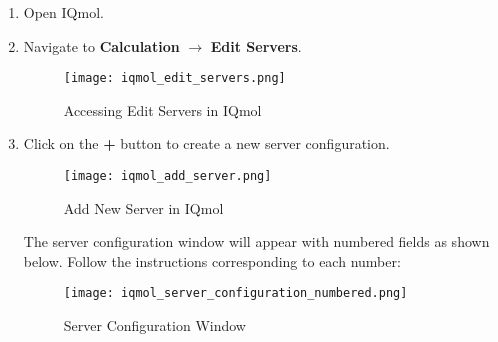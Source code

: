 \documentclass[12pt,letterpaper]{article}
\begin{document}
\begin{enumerate}
    \item Open IQmol.
    \item Navigate to \textbf{Calculation} $\rightarrow$ \textbf{Edit Servers}.

    \begin{figure}[H]
        \centering
        \texttt{[image: iqmol\_edit\_servers.png]}
        \caption{Accessing Edit Servers in IQmol}
        \label{fig:iqmol_edit_servers}
    \end{figure}

    \item Click on the \textbf{+} button to create a new server configuration.

    \begin{figure}[H]
        \centering
        \texttt{[image: iqmol\_add\_server.png]}
        \caption{Add New Server in IQmol}
        \label{fig:iqmol_add_server}
    \end{figure}

    The server configuration window will appear with numbered fields as shown below. Follow the instructions corresponding to each number:

    \begin{figure}[H]
        \centering
        \texttt{[image: iqmol\_server\_configuration\_numbered.png]}
        \caption{Server Configuration Window}
        \label{fig:iqmol_server_configuration}
    \end{figure}


\end{enumerate}
\end{document}
